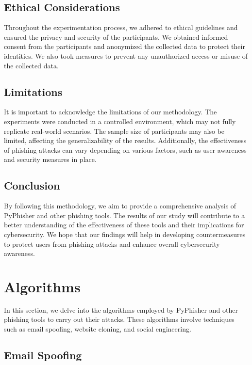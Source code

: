 \documentclass[openany]{report}
\begin{document}
\subsection{Ethical Considerations}

Throughout the experimentation process, we adhered to ethical guidelines and ensured the privacy and security of the participants. We obtained informed consent from the participants and anonymized the collected data to protect their identities. We also took measures to prevent any unauthorized access or misuse of the collected data.

\subsection{Limitations}

It is important to acknowledge the limitations of our methodology. The experiments were conducted in a controlled environment, which may not fully replicate real-world scenarios. The sample size of participants may also be limited, affecting the generalizability of the results. Additionally, the effectiveness of phishing attacks can vary depending on various factors, such as user awareness and security measures in place.

\subsection{Conclusion}

By following this methodology, we aim to provide a comprehensive analysis of PyPhisher and other phishing tools. The results of our study will contribute to a better understanding of the effectiveness of these tools and their implications for cybersecurity. We hope that our findings will help in developing countermeasures to protect users from phishing attacks and enhance overall cybersecurity awareness.


\section{Algorithms}

In this section, we delve into the algorithms employed by PyPhisher and other phishing tools to carry out their attacks. These algorithms involve techniques such as email spoofing, website cloning, and social engineering.

\subsection{Email Spoofing}
\end{document}
